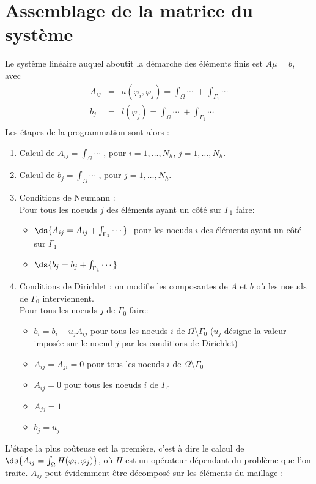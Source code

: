 \section{Assemblage de la matrice du syst\`eme}
\noindent
%
%
Le syst\`eme lin\'eaire auquel aboutit la d\'emarche des \'el\'ements finis est 
$A\mu=b$, avec
\begin{eqnarray*}
A_{ij} & = & a(\varphi_i,\varphi_j) = \int_\Omega \cdots \; + \int_{\Gamma_1} \cdots\\
b_{j} & = & l(\varphi_j) = \int_\Omega \cdots \; + \int_{\Gamma_1} \cdots\\
\end{eqnarray*}
%
Les \'etapes de la programmation sont alors :
\begin{enumerate}
\item Calcul de $A_{ij}=\int_\Omega \cdots$ , pour $i=1,\ldots,N_h$, $j=1,\ldots,N_h$.
%
\item Calcul de $b_j=\int_\Omega \cdots$ , pour $j=1,\ldots,N_h$.
%
\item Conditions de Neumann : \\
Pour tous les noeuds $j$ des \'el\'ements ayant un c\^ot\'e sur $\Gamma_1$ faire:
\begin{itemize}
\item $\ds{A_{ij}=A_{ij} + \int_{\Gamma_1} \cdots}\;$ pour les noeuds $i$ des \'el\'ements ayant un c\^ot\'e sur $\Gamma_1$
\item $\ds{b_j=b_j + \int_{\Gamma_1} \cdots }$
\end{itemize}
%
\item Conditions de Dirichlet : on modifie les composantes de $A$ et $b$ o\`u les noeuds de $\Gamma_0$ interviennent.\\
Pour tous les noeuds $j$ de $\Gamma_0$ faire:
\begin{itemize}
\item $b_i=b_i-u_j A_{ij}$ pour tous les noeuds $i$ de $\Omega \setminus \Gamma_0$ ($u_j$ d\'esigne la valeur impos\'ee sur le noeud $j$ par les conditions de Dirichlet)
\item $A_{ij}=A_{ji}=0$ pour tous les noeuds $i$ de $\Omega \setminus \Gamma_0$
\item $A_{ij}=0$ pour tous les noeuds $i$ de $\Gamma_0$
\item $A_{jj}=1$
\item $b_j=u_j$
\end{itemize}
%
\vspace*{10 mm}
\end{enumerate}
%
%
L'\'etape la plus co\^uteuse est la premi\`ere, c'est \`a dire le calcul de $\ds{A_{ij}=\int_\Omega H(\varphi_i,\varphi_j)}$, o\`u $H$ est un op\'erateur d\'ependant du probl\`eme que l'on traite. $A_{ij}$ peut \'evidemment \^etre d\'ecompos\'e sur les \'el\'ements du maillage :
